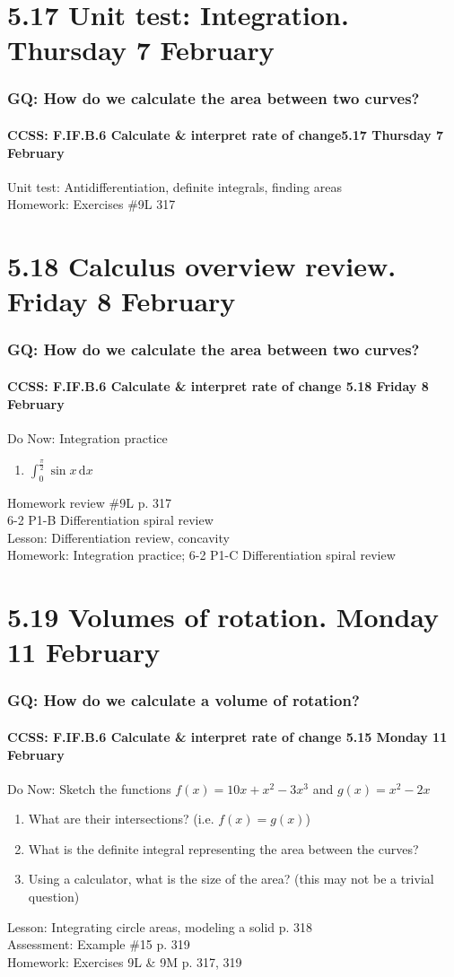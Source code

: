\documentclass{beamer}
\begin{document}
\section{5.17 Unit test: Integration. Thursday 7 February}
\frame
{
  \frametitle{GQ: How do we calculate the area between two curves?}
  \framesubtitle{CCSS: F.IF.B.6 Calculate \& interpret rate of change\hfill \alert{5.17 Thursday 7 February}}
  \alert{Unit test:} Antidifferentiation, definite integrals, finding areas\\%
  Homework: Exercises \#9L 317
}

\section{5.18 Calculus overview review. Friday 8 February}
  \frame
  {
    \frametitle{GQ: How do we calculate the area between two curves?}
    \framesubtitle{CCSS: F.IF.B.6 Calculate \& interpret rate of change \hfill \alert{5.18 Friday 8 February}}

    \begin{block}{Do Now: Integration practice}
    \begin{enumerate}
      \item $\displaystyle \int_0^{\frac{\pi}{2}} \sin x \,\mathrm{d}x$
    \end{enumerate}
    \end{block}
    Homework review \#9L p. 317\\
    6-2 P1-B Differentiation spiral review\\
    Lesson: Differentiation review, concavity\\%
    Homework: Integration practice; 6-2 P1-C Differentiation spiral review
  }

\section{5.19 Volumes of rotation. Monday 11 February}
  \frame
  {
    \frametitle{GQ: How do we calculate a volume of rotation?}
    \framesubtitle{CCSS: F.IF.B.6 Calculate \& interpret rate of change \hfill \alert{5.15 Monday 11 February}}

    \begin{block}{Do Now: Sketch the functions $f(x)=10x+x^2-3x^3$ and $g(x)=x^2-2x$}
    \begin{enumerate}
        \item What are their intersections? (i.e. $f(x)=g(x)$)
        \item What is the definite integral representing the area between the curves?
        \item Using a calculator, what is the size of the area? (this may not be a trivial question)
    \end{enumerate}
    \end{block}
    Lesson: Integrating circle areas, modeling a solid p. 318\\%
    Assessment: Example \#15 p. 319 \\%
    Homework: Exercises 9L \& 9M p. 317, 319
  }
\end{document}
